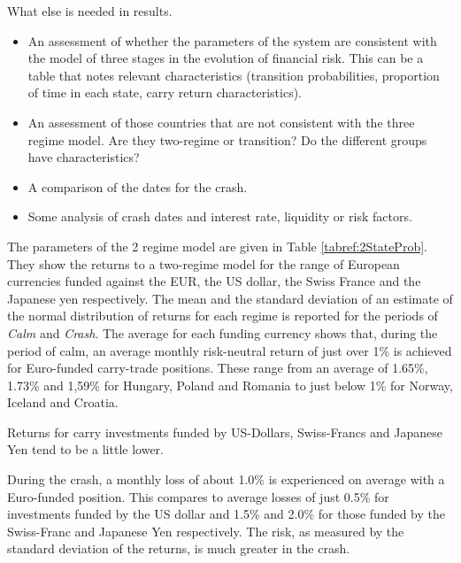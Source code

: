 \documentclass[12pt, a4paper, oneside]{article} %
\begin{document}
What else is needed in results.
\begin{itemize}
\item An assessment of whether the parameters of the system are consistent with the model of three stages in the evolution of financial risk.  This can be a table that notes relevant characteristics (transition probabilities, proportion of time in each state, carry return characteristics). 
\item An assessment of those countries that are not consistent with the three regime model.  Are they two-regime or transition?  Do the different groups have characteristics? 
\item A comparison of the dates for the crash. 
\item Some analysis of crash dates and interest rate, liquidity or risk factors. 
\end{itemize}
 
  
The parameters of the 2 regime model are given in Table \ref{tabref:2StateProb}.  They show the returns to a two-regime model for the range of European currencies funded against the EUR, the US dollar, the Swiss France and the Japanese yen respectively.  The mean and the standard deviation of an estimate of the normal distribution of returns for each regime is reported for the periods of \emph{Calm} and \emph{Crash}.  The average for each funding currency shows that, during the period of calm, an average  monthly risk-neutral return of just over 1\% is achieved for Euro-funded carry-trade positions. These range from an average of 1.65\%, 1.73\% and 1,59\% for Hungary, Poland and Romania to just below 1\% for Norway, Iceland and Croatia. 

Returns for carry investments funded by US-Dollars, Swiss-Francs and Japanese Yen tend to be a little lower. 

During the crash, a monthly loss of about 1.0\% is experienced on average with a Euro-funded position.  This compares to average losses of just 0.5\% for investments funded by the US dollar and 1.5\% and 2.0\% for those funded by the Swiss-Franc and Japanese Yen respectively. The risk, as measured by the standard deviation of the  returns, is much greater in the crash.   
\end{document}
